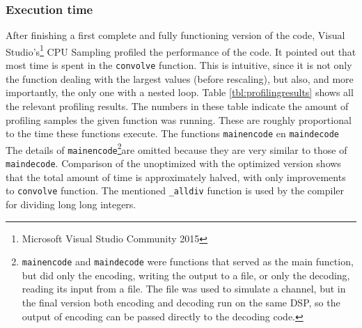 \documentclass[a4paper]{article}
\begin{document}
\subsubsection{Execution time}\label{sec:processing}
After finishing a first complete and fully functioning version of the code, Visual Studio's\footnote{Microsoft Visual Studio Community 2015} CPU Sampling profiled the performance of the code. It pointed out that most time is spent in the \texttt{convolve} function. This is intuitive, since it is not only the function dealing with the largest values (before rescaling), but also, and more importantly, the only one with a nested loop. Table \ref{tbl:profilingresults} shows all the relevant profiling results. The numbers in these table indicate the amount of profiling samples the given function was running. These are roughly proportional to the time these functions execute. The functions \texttt{mainencode} en \texttt{maindecode} The details of \texttt{mainencode}\footnote{\texttt{mainencode} and \texttt{maindecode} were functions that served as the main function, but did only the encoding, writing the output to a file, or only the decoding, reading its input from a file. The file was used to simulate a channel, but in the final version both encoding and decoding run on the same DSP, so the output of encoding can be passed directly to the decoding code.}are omitted because they are very similar to those of \texttt{maindecode}. Comparison of the unoptimized with the optimized version shows that the total amount of time is approximately halved, with only improvements to \texttt{convolve} function. The mentioned \texttt{\_alldiv} function is used by the compiler for dividing long long integers.\\
\end{document}
